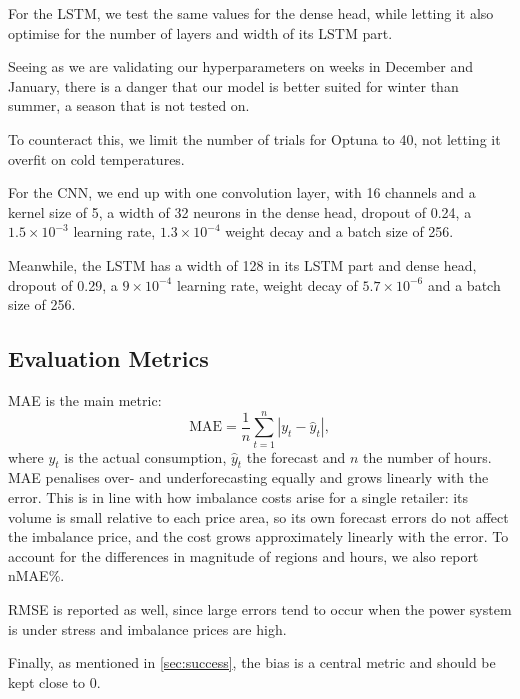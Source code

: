 \documentclass[11pt,a4paper]{article}
\begin{document}
For the LSTM, we test the same values for the dense head, while letting it also optimise for the number of layers and width of its LSTM part.

Seeing as we are validating our hyperparameters on weeks in December and January, there is a danger that our model is better suited for winter than summer, a season that is not tested on.

To counteract this, we limit the number of trials for Optuna to 40, not letting it overfit on cold temperatures.

For the CNN, we end up with one convolution layer, with 16 channels and a kernel size of 5, a width of 32 neurons in the dense head, dropout of 0.24, a $1.5 \times 10^{-3}$ learning rate, $1.3 \times 10^{-4}$ weight decay and a batch size of 256.

Meanwhile, the LSTM has a width of 128 in its LSTM part and dense head, dropout of 0.29, a $9 \times 10^{-4}$ learning rate, weight decay of $5.7 \times 10^{-6}$ and a batch size of 256.
\newpage
\subsection{Evaluation Metrics}
\label{sec:metrics}

MAE is the main metric:
\begin{equation}
    \text{MAE} = \frac{1}{n}\sum_{t=1}^{n} \left| y_t - \hat{y}_t \right|,
    \label{eq:mae}
\end{equation}
where $y_t$ is the actual consumption, $\hat{y}_t$ the forecast and $n$ the number of hours. MAE penalises over- and underforecasting equally and grows linearly with the error. This is in line with how imbalance costs arise for a single retailer: its volume is small relative to each price area, so its own forecast errors do not affect the imbalance price, and the cost grows approximately linearly with the error. To account for the differences in magnitude of regions and hours, we also report nMAE\%.

RMSE is reported as well, since large errors tend to occur when the power system is under stress and imbalance prices are high.

Finally, as mentioned in \cref{sec:success}, the bias is a central metric and should be kept close to 0.
\end{document}
